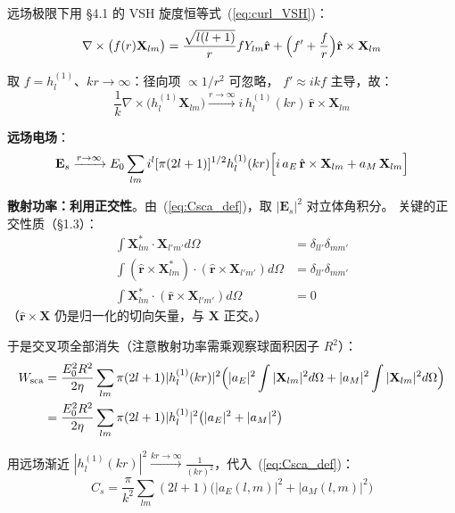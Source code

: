 远场极限下用 \S4.1 的 VSH 旋度恒等式~(\ref{eq:curl_VSH})：
\begin{equation}
  \nabla\times\bigl(f(r)\mathbf{X}_{lm}\bigr)
  = \frac{\sqrt{l(l+1)}}{r}fY_{lm}\hat{\mathbf{r}}
    + \Bigl(f' + \frac{f}{r}\Bigr)\hat{\mathbf{r}}\times\mathbf{X}_{lm}
\end{equation}

取 $f=h_l^{(1)}$、$kr\to\infty$：径向项 $\propto 1/r^2$ 可忽略，
$f' \approx ikf$ 主导，故：
\begin{equation}
  \frac{1}{k}\nabla\times\bigl(h_l^{(1)}\mathbf{X}_{lm}\bigr)
  \xrightarrow{r\to\infty} i\,h_l^{(1)}(kr)\,\hat{\mathbf{r}}\times\mathbf{X}_{lm}
\end{equation}

\textbf{远场电场}：
\begin{equation}
  \mathbf{E}_s \xrightarrow{r\to\infty}
  E_0\sum_{lm} i^l[\pi(2l+1)]^{1/2}h_l^{(1)}(kr)\Bigl[
    i\,a_E\,\hat{\mathbf{r}}\times\mathbf{X}_{lm} + a_M\,\mathbf{X}_{lm}\Bigr]
  \label{eq:grahn_Es_far}
\end{equation}

\textbf{散射功率：利用正交性}。由~(\ref{eq:Csca_def})，取 $|\mathbf{E}_s|^2$ 对立体角积分。
关键的正交性质（\S1.3）：
\begin{align}
  \int \mathbf{X}_{lm}^*\cdot\mathbf{X}_{l'm'}d\Omega &= \delta_{ll'}\delta_{mm'} \\
  \int(\hat{\mathbf{r}}\times\mathbf{X}_{lm}^*)\cdot(\hat{\mathbf{r}}\times\mathbf{X}_{l'm'})d\Omega
    &= \delta_{ll'}\delta_{mm'} \\
  \int \mathbf{X}_{lm}^*\cdot(\hat{\mathbf{r}}\times\mathbf{X}_{l'm'})d\Omega &= 0
\end{align}
（$\hat{\mathbf{r}}\times\mathbf{X}$ 仍是归一化的切向矢量，与 $\mathbf{X}$ 正交。）

于是交叉项全部消失（注意散射功率需乘观察球面积因子 $R^2$）：
\begin{align}
  W_{\text{sca}} &= \frac{E_0^2 R^2}{2\eta}\sum_{lm}\pi(2l+1)|h_l^{(1)}(kr)|^2\Bigl(
    |a_E|^2\int|\mathbf{X}_{lm}|^2d\Omega
    + |a_M|^2\int|\mathbf{X}_{lm}|^2d\Omega\Bigr) \notag\\
  &= \frac{E_0^2 R^2}{2\eta}\sum_{lm}\pi(2l+1)|h_l^{(1)}|^2\bigl(|a_E|^2+|a_M|^2\bigr)
\end{align}

用远场渐近 $|h_l^{(1)}(kr)|^2 \xrightarrow{kr\to\infty}\frac{1}{(kr)^2}$，代入~(\ref{eq:Csca_def})：
\begin{equation}
  \boxed{\;
  C_s = \frac{\pi}{k^2}\sum_{lm}(2l+1)\bigl(|a_E(l,m)|^2 + |a_M(l,m)|^2\bigr)
  \;}
  \label{eq:Cs_grahn}
\end{equation}

